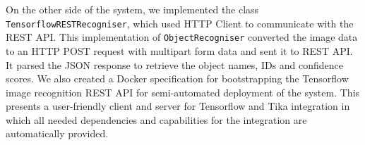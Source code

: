 
On the other side of the system, we implemented the class \texttt{TensorflowRESTRecogniser}, which used HTTP Client to communicate with the REST API. This implementation of \texttt{ObjectRecogniser} converted the image data to an HTTP POST request with multipart form data and sent it to REST API. It parsed the JSON response to retrieve the object names, IDs and confidence scores. We also created a Docker specification for bootstrapping the Tensorflow image recognition REST API for semi-automated deployment of the system. This presents a user-friendly client and server for Tensorflow and Tika integration in which all needed dependencies and capabilities for the integration are automatically provided.

